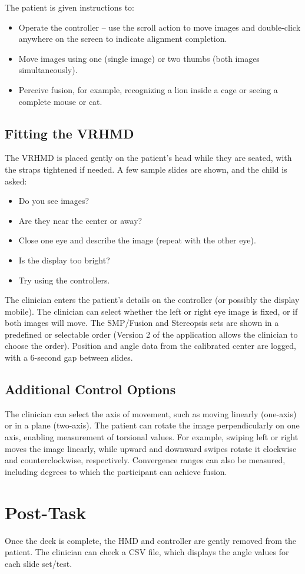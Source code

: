\documentclass{article}
\begin{document}
The patient is given instructions to:

\begin{itemize}
\item Operate the controller -- use the scroll action to move images and double-click anywhere on the screen to indicate alignment completion.
\item Move images using one (single image) or two thumbs (both images simultaneously).
\item Perceive fusion, for example, recognizing a lion inside a cage or seeing a complete mouse or cat.
\end{itemize}

\subsection{Fitting the VRHMD}

The VRHMD is placed gently on the patient's head while they are seated, with the straps tightened if needed. A few sample slides are shown, and the child is asked:

\begin{itemize}
\item Do you see images?
\item Are they near the center or away?
\item Close one eye and describe the image (repeat with the other eye).
\item Is the display too bright?
\item Try using the controllers.
\end{itemize}

The clinician enters the patient's details on the controller (or possibly the display mobile). The clinician can select whether the left or right eye image is fixed, or if both images will move. The SMP/Fusion and Stereopsis sets are shown in a predefined or selectable order (Version 2 of the application allows the clinician to choose the order). Position and angle data from the calibrated center are logged, with a 6-second gap between slides.

\subsection{Additional Control Options}

The clinician can select the axis of movement, such as moving linearly (one-axis) or in a plane (two-axis). The patient can rotate the image perpendicularly on one axis, enabling measurement of torsional values. For example, swiping left or right moves the image linearly, while upward and downward swipes rotate it clockwise and counterclockwise, respectively. Convergence ranges can also be measured, including degrees to which the participant can achieve fusion.

\section{Post-Task}

Once the deck is complete, the HMD and controller are gently removed from the patient. The clinician can check a CSV file, which displays the angle values for each slide set/test.
\end{document}
